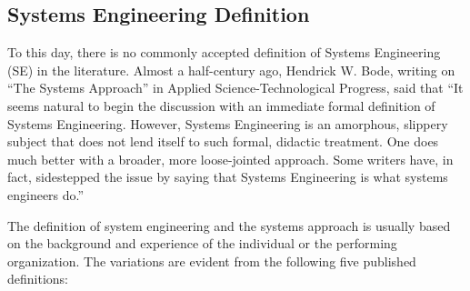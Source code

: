 \subsection{Systems Engineering Definition}

To this day, there is no commonly accepted definition of Systems Engineering (SE) in the literature. Almost a half-century ago, Hendrick W. Bode, writing on ``The Systems Approach'' in Applied Science-Technological Progress, said that ``It seems natural to begin the discussion with an immediate formal definition of Systems Engineering. However, Systems Engineering is an amorphous, slippery subject that does not lend itself to such formal, didactic treatment. One does much better with a broader, more loose-jointed approach. Some writers have, in fact, sidestepped the issue by saying that Systems Engineering is what systems engineers do.''

The definition of system engineering and the systems approach is usually based on the background and experience of the individual or the performing organization. The variations are evident from the following five published definitions:

